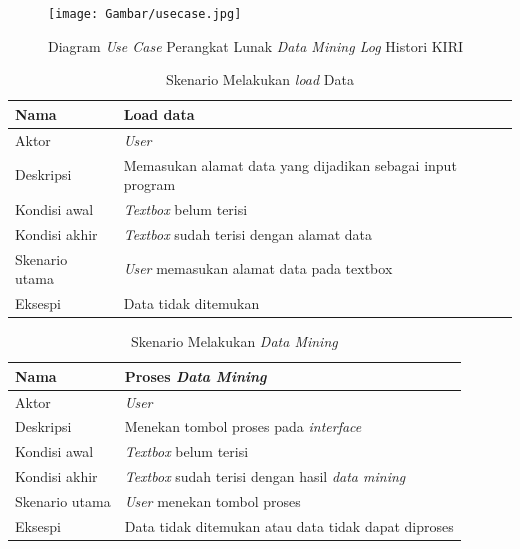 \begin{figure}[H]
\centering
\texttt{[image: Gambar/usecase.jpg]}
\caption[Diagram \textsl{Use Case} Perangkat Lunak \textsl{Data Mining Log} Histori KIRI]{Diagram \textsl{Use Case} Perangkat Lunak \textsl{Data Mining Log} Histori KIRI} 
\label{fig:diagramUseCase}
\end{figure}

\begin{table}[H]
\centering
\caption{Skenario Melakukan \textsl{load} Data}
\begin{tabular}{|l|l|}
\hline
Nama           & Load data                                                       \\ \hline
Aktor          & \textit{User}                                                   \\ \hline
Deskripsi      & Memasukan alamat data yang dijadikan sebagai input program \\ \hline
Kondisi awal   & \textsl{Textbox} belum terisi                                   \\ \hline
Kondisi akhir  & \textsl{Textbox} sudah terisi dengan alamat data                \\ \hline
Skenario utama & \textit{User} memasukan alamat data pada textbox                \\ \hline
Eksespi        & Data tidak ditemukan                                            \\ \hline
\end{tabular}
\end{table}

\begin{table}[H]
\centering
\caption{Skenario Melakukan \textsl{Data Mining}}
\begin{tabular}{|l|l|}
\hline
Nama           & Proses \textsl{Data Mining }                      								\\ \hline
Aktor          & \textit{User}                                 										\\ \hline
Deskripsi      & Menekan tombol proses pada \textsl{interface}       					    \\ \hline
Kondisi awal   & \textsl{Textbox} belum terisi                          					\\ \hline
Kondisi akhir  & \textsl{Textbox} sudah terisi dengan hasil \textsl{data mining}  \\ \hline
Skenario utama & \textit{User} menekan tombol proses         										  \\ \hline
Eksespi        & Data tidak ditemukan atau data tidak dapat diproses    		  	  \\ \hline
\end{tabular}
\end{table}

